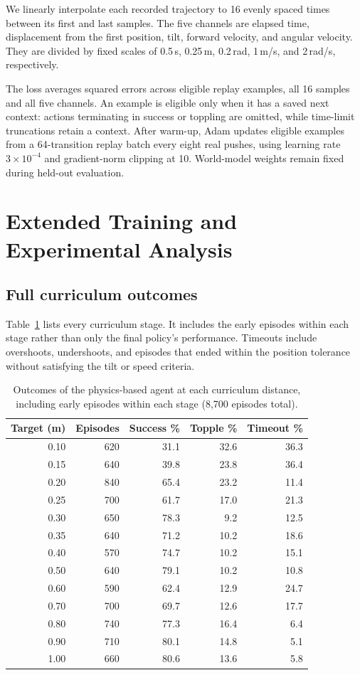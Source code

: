 \documentclass[12pt]{article}
\begin{document}
We linearly interpolate each recorded trajectory to 16 evenly spaced times between its first and last samples. The five channels are elapsed time, displacement from the first position, tilt, forward velocity, and angular velocity. They are divided by fixed scales of 0.5\,s, 0.25\,m, 0.2\,rad, 1\,m/s, and 2\,rad/s, respectively.

The loss averages squared errors across eligible replay examples, all 16 samples and all five channels. An example is eligible only when it has a saved next context: actions terminating in success or toppling are omitted, while time-limit truncations retain a context. After warm-up, Adam updates eligible examples from a 64-transition replay batch every eight real pushes, using learning rate $3\times10^{-4}$ and gradient-norm clipping at 10. World-model weights remain fixed during held-out evaluation.


\section{Extended Training and Experimental Analysis}\label{app:extended-analysis}
\subsection{Full curriculum outcomes}
Table~\ref{tab:curriculum} lists every curriculum stage. It includes the early episodes within each stage rather than only the final policy's performance. Timeouts include overshoots, undershoots, and episodes that ended within the position tolerance without satisfying the tilt or speed criteria.

\begin{table}[H]
\centering
\small
\begin{tabular}{rrrrr}
\toprule
Target (m) & Episodes & Success \% & Topple \% & Timeout \% \\
\midrule
0.10 & 620 & 31.1 & 32.6 & 36.3 \\
0.15 & 640 & 39.8 & 23.8 & 36.4 \\
0.20 & 840 & 65.4 & 23.2 & 11.4 \\
0.25 & 700 & 61.7 & 17.0 & 21.3 \\
0.30 & 650 & 78.3 & 9.2 & 12.5 \\
0.35 & 640 & 71.2 & 10.2 & 18.6 \\
0.40 & 570 & 74.7 & 10.2 & 15.1 \\
0.50 & 640 & 79.1 & 10.2 & 10.8 \\
0.60 & 590 & 62.4 & 12.9 & 24.7 \\
0.70 & 700 & 69.7 & 12.6 & 17.7 \\
0.80 & 740 & 77.3 & 16.4 & 6.4 \\
0.90 & 710 & 80.1 & 14.8 & 5.1 \\
1.00 & 660 & 80.6 & 13.6 & 5.8 \\
\bottomrule
\end{tabular}
\caption{Outcomes of the physics-based agent at each curriculum distance, including early episodes within each stage (8,700 episodes total).}
\label{tab:curriculum}
\end{table}
\end{document}
